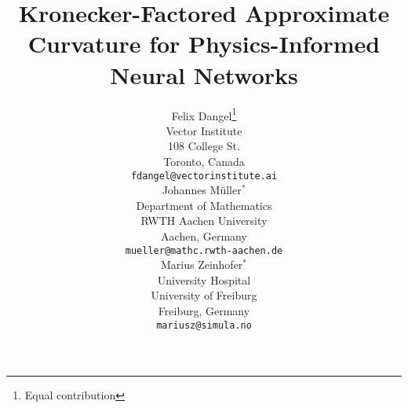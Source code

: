 \newcommand{\papertitle}{%
  Kronecker-Factored Approximate Curvature for Physics-Informed Neural Networks
}
\title{\papertitle}

%

\author{%
  Felix Dangel\thanks{Equal contribution}\\
  Vector Institute \\
  108 College St. \\
  Toronto, Canada \\
  \texttt{fdangel@vectorinstitute.ai} \\
  \And
  Johannes M\"uller$^*$\\
  Department of Mathematics \\
  RWTH Aachen University \\
  Aachen, Germany \\
  \texttt{mueller@mathc.rwth-aachen.de} \\
  \And
  Marius Zeinhofer$^*$\\
  University Hospital \\
  University of Freiburg \\
  Freiburg, Germany \\
  \texttt{mariusz@simula.no}
}
